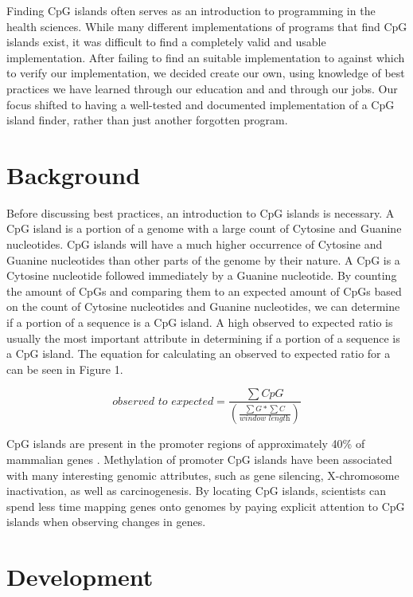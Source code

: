 \documentclass{bioinfo}
\begin{document}
Finding CpG islands often serves as an introduction to programming in
the health sciences. While many different implementations of programs
that find CpG islands exist, it was difficult to find a completely
valid and usable implementation. After failing to find an suitable
implementation to against which to verify our implementation, we
decided create our own, using knowledge of best practices we have
learned through our education and and through our jobs. Our focus
shifted to having a well-tested and documented implementation of a CpG
island finder, rather than just another forgotten program.
    
\section{Background}

Before discussing best practices, an introduction to CpG islands is
necessary. A CpG island is a portion of a genome with a large count of
Cytosine and Guanine nucleotides. CpG islands will have a
much higher occurrence of Cytosine and Guanine nucleotides than other
parts of the genome by their nature. A CpG is a Cytosine nucleotide
followed immediately by a Guanine nucleotide. By counting the amount
of CpGs and comparing them to an expected amount of CpGs based on the
count of Cytosine nucleotides and Guanine nucleotides, we can
determine if a portion of a sequence is a CpG island. A high observed
to expected ratio is usually the most important attribute in
determining if a portion of a sequence is a CpG island. The equation
for calculating an observed to expected ratio for a can be seen in
Figure 1.

\begin{equation}
    \textit{observed to expected} = \frac{\sum CpG}{(\frac{\sum G * \sum C}{\textit{window length}})} \label{eq:01}
\end{equation}
      
CpG islands are present in the promoter regions of approximately 40\%
of mammalian genes \citep{pmid11891299}. Methylation of promoter CpG
islands have been associated with many interesting genomic attributes,
such as gene silencing, X-chromosome inactivation, as well as
carcinogenesis. By locating CpG islands, scientists can spend less
time mapping genes onto genomes by paying explicit attention to CpG
islands when observing changes in genes.

\section{Development}
\end{document}
